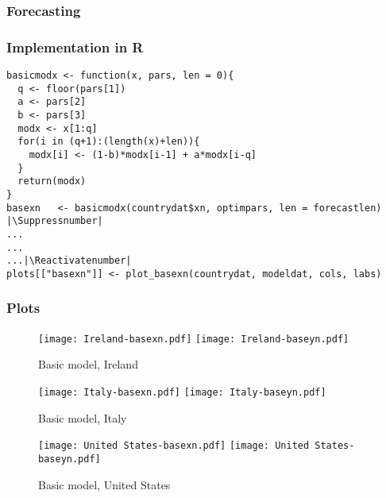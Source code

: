 \subsubsection{Forecasting}

\subsubsection{Implementation in R}

\begin{lstlisting}[breaklines = true, escapeinside=||, tabsize = 4, caption = {Algorithm for Base Model}]
basicmodx <- function(x, pars, len = 0){
  q <- floor(pars[1])
  a <- pars[2]
  b <- pars[3]
  modx <- x[1:q]
  for(i in (q+1):(length(x)+len)){
    modx[i] <- (1-b)*modx[i-1] + a*modx[i-q]
  }
  return(modx)
}
basexn   <- basicmodx(countrydat$xn, optimpars, len = forecastlen)  |\Suppressnumber|
...
...
...|\Reactivatenumber|
plots[["basexn"]] <- plot_basexn(countrydat, modeldat, cols, labs)
\end{lstlisting}

\subsubsection{Plots}

\begin{figure}[H]
  \texttt{[image: Ireland-basexn.pdf]} \label{fig:ireland-basexn}
\endminipage\hfill
{}
  \texttt{[image: Ireland-baseyn.pdf]} \label{fig:ireland-baseyn}
\endminipage
\caption{Basic model, Ireland}
\end{figure}

\begin{figure}[H]
  \texttt{[image: Italy-basexn.pdf]} \label{fig:italy-basexn}
\endminipage\hfill
{}
  \texttt{[image: Italy-baseyn.pdf]} \label{fig:italy-baseyn}
\endminipage
\caption{Basic model, Italy}
\end{figure}

\begin{figure}[H]
  \texttt{[image: United States-basexn.pdf]} \label{fig:usa-basexn}
\endminipage\hfill
{}
  \texttt{[image: United States-baseyn.pdf]} \label{fig:usa-baseyn}
\endminipage
\caption{Basic model, United States}
\end{figure}

